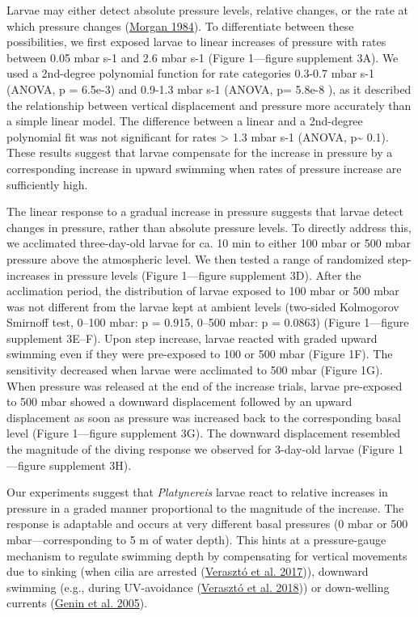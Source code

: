\documentclass[
]{article}
\begin{document}
Larvae may either detect absolute pressure levels, relative changes, or
the rate at which pressure changes
(\protect\hyperlink{ref-morgan_1984}{Morgan 1984}). To differentiate
between these possibilities, we first exposed larvae to linear increases
of pressure with rates between 0.05 mbar s-1 and 2.6 mbar s-1 (Figure
1---figure supplement 3A). We used a 2nd-degree polynomial function for
rate categories 0.3-0.7 mbar s-1 (ANOVA, p = 6.5e-3) and 0.9-1.3 mbar
s-1 (ANOVA, p= 5.8e-8 ), as it described the relationship between
vertical displacement and pressure more accurately than a simple linear
model. The difference between a linear and a 2nd-degree polynomial fit
was not significant for rates \textgreater{} 1.3 mbar s-1 (ANOVA,
p\textasciitilde{} 0.1). These results suggest that larvae compensate
for the increase in pressure by a corresponding increase in upward
swimming when rates of pressure increase are sufficiently high.

The linear response to a gradual increase in pressure suggests that
larvae detect changes in pressure, rather than absolute pressure levels.
To directly address this, we acclimated three-day-old larvae for ca. 10
min to either 100 mbar or 500 mbar pressure above the atmospheric level.
We then tested a range of randomized step-increases in pressure levels
(Figure 1---figure supplement 3D). After the acclimation period, the
distribution of larvae exposed to 100 mbar or 500 mbar was not different
from the larvae kept at ambient levels (two-sided Kolmogorov Smirnoff
test, 0--100 mbar: p = 0.915, 0--500 mbar: p = 0.0863) (Figure
1---figure supplement 3E--F). Upon step increase, larvae reacted with
graded upward swimming even if they were pre-exposed to 100 or 500 mbar
(Figure 1F). The sensitivity decreased when larvae were acclimated to
500 mbar (Figure 1G). When pressure was released at the end of the
increase trials, larvae pre-exposed to 500 mbar showed a downward
displacement followed by an upward displacement as soon as pressure was
increased back to the corresponding basal level (Figure 1---figure
supplement 3G). The downward displacement resembled the magnitude of the
diving response we observed for 3-day-old larvae (Figure 1---figure
supplement 3H).

Our experiments suggest that \emph{Platynereis} larvae react to relative
increases in pressure in a graded manner proportional to the magnitude
of the increase. The response is adaptable and occurs at very different
basal pressures (0 mbar or 500 mbar---corresponding to 5 m of water
depth). This hints at a pressure-gauge mechanism to regulate swimming
depth by compensating for vertical movements due to sinking (when cilia
are arrested (\protect\hyperlink{ref-veraszto2017a}{Verasztó et al.
2017})), downward swimming (e.g., during UV-avoidance
(\protect\hyperlink{ref-veraszto2018}{Verasztó et al. 2018})) or
down-welling currents (\protect\hyperlink{ref-genin2005a}{Genin et al.
2005}).
\end{document}
